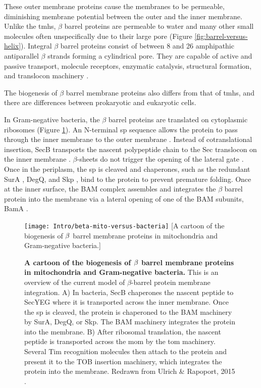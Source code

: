 These outer membrane proteins cause the membranes to be permeable, diminishing membrane potential between the outer and the inner membrane.
Unlike the \gls{tmh}s, $\beta$ barrel proteins are permeable to water and many other small molecules often unspecifically due to their large pore (Figure \ref{fig:barrel-versus-helix}).
Integral $\beta$ barrel proteins consist of between 8 and 26 amphipathic antiparallel $\beta$ strands forming a cylindrical pore.
They are capable of active and passive transport, molecule receptors, enzymatic catalysis, structural formation, and translocon machinery \cite{Wimley2003}.

The biogenesis of $\beta$ barrel membrane proteins also differs from that of \gls{tmh}s, and there are differences between prokaryotic and eukaryotic cells.

In Gram\--negative bacteria, the $\beta$ barrel proteins are translated on cytoplasmic ribosomes (Figure \ref{fig:beta-mito-versus-bacteria}).
An N-terminal \gls{sp} sequence allows the protein to pass through the inner membrane to the outer membrane \cite{Driessen2008, Papanikou2007}.
Instead of cotranslational insertion, SecB transports the nascent polypeptide chain to the Sec translocon on the inner membrane \cite{Bechtluft2010}.
$\beta$\--sheets do not trigger the opening of the lateral gate \cite{Ulrich2015}.
Once in the periplasm, the \gls{sp} is cleaved \cite{Paetzel2014} and chaperones, such as the redundant SurA \cite{Lazar1996, Volokhina2011}, DegQ, and Skp \cite{Volokhina2011}, bind to the protein to prevent premature folding.
Once at the inner surface, the BAM complex assembles and integrates the $\beta$ barrel protein into the membrane \cite{Wu2005, Hagan2010} via a lateral opening of one of the BAM subunits, BamA \cite{Noinaj2014}.

\begin{figure}[ht]
\centering
\texttt{[image: Intro/beta-mito-versus-bacteria]}
		[A cartoon of the biogenesis of $\protect\beta$ barrel membrane proteins in mitochondria and Gram\--negative bacteria.]{\textbf{A cartoon of the biogenesis of $\protect\beta$ barrel membrane proteins in mitochondria and Gram\--negative bacteria.}
		This is an overview of the current model of $\beta$\--barrel protein membrane integration.
		A) In bacteria, SecB chaperones the nascent peptide to SecYEG where it is transported across the inner membrane.
		Once the \gls{sp} is cleaved, the protein is chaperoned to the BAM machinery by SurA, DegQ, or Skp.
		The BAM machinery integrates the protein into the membrane.
		B) After ribosomal translation, the nascent peptide is transported across the \gls{mom} by the \gls{tom} machinery.
		Several Tim recognition molecules then attach to the protein and present it to the TOB insertion machinery, which integrates the protein into the membrane.
		Redrawn from Ulrich \& Rapoport, 2015 \cite{Ulrich2015}.

		}
\label{fig:beta-mito-versus-bacteria}
\end{figure}

